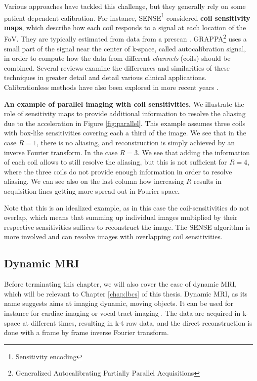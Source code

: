 Various approaches have tackled this challenge, but they generally rely on some patient-dependent calibration. For instance, SENSE\footnote{Sensitivity encoding} \citep{pruessmann1999sense} considered \textbf{coil sensitivity maps}, which describe how each coil responds to a signal at each location of the FoV. They are typically estimated from data from a prescan \citep{blaimer2004smash}. GRAPPA\footnote{Generalized Autocalibrating Partially Parallel Acquisitions} \citep{griswold2002generalized} uses a small part of the signal near the center of k-space, called autocalibration signal, in order to compute how the data from different \textit{channels} (coils) should be combined. Several reviews \citep{blaimer2004smash, glockner2005parallel,deshmane2012parallel} examine the differences and similarities of these techniques in greater detail and detail various clinical applications. Calibrationless methods have also been explored in more recent years \citep{trzasko2011calibrationless,majumdar2012calibration,el2019calibrationless}.

\textbf{An example of parallel imaging with coil sensitivities.} We illustrate the role of sensitivity maps to provide additional information to resolve the aliasing due to the acceleration in Figure \ref{fig:parallel}. This example assumes three coils with box-like sensitivities covering each a third of the image. 
We see that in the case $R=1$, there is no aliasing, and reconstruction is simply achieved by an inverse Fourier transform. In the case $R=3$. We see that adding the information of each coil allows to still resolve the aliasing, but this is not sufficient for $R=4$, where the three coils do not provide enough information in order to resolve aliasing. We can see also on the last column how increasing $R$ results in acquisition lines getting more spread out in Fourier space. 

Note that this is an idealized example, as in this case the coil-sensitivities do not overlap, which means that summing up individual images multiplied by their respective sensitivities suffices to reconstruct the image. The SENSE algorithm is more involved and can resolve images with overlapping coil sensitivities.




\subsection{Dynamic MRI}
Before terminating this chapter, we will also cover the case of dynamic MRI, which will be relevant to Chapter \ref{chap:lbcs} of this thesis.  Dynamic MRI, as its name suggests aims at imaging dynamic, moving objects. It can be used for instance for cardiac imaging \citep{tsao2003k} or vocal tract imaging \citep{echternach2010vocal}. The data are acquired in k-space at different times, resulting in k-t raw data, and the direct reconstruction is done with a frame by frame inverse Fourier transform. 

